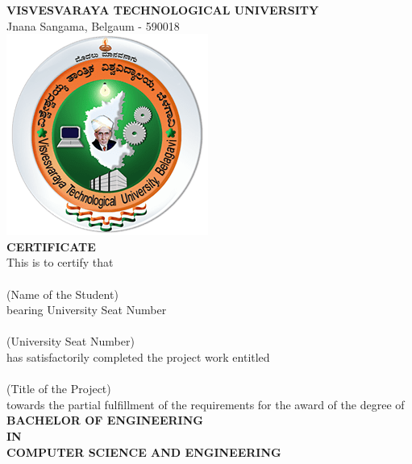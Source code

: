\documentclass[11pt, a4paper]{report}
\begin{document}
\begin{titlepage}
    \begin{center}
        \textbf{\Large VISVESVARAYA TECHNOLOGICAL UNIVERSITY}\\
        {\normalsize Jnana Sangama, Belgaum - 590018}\\[0.6cm]
        
        \includegraphics[scale=0.4]{resources/vtu.png}\\[0.5cm]
        
        {\Large \textbf{CERTIFICATE}}\\[1cm]
        {\normalsize This is to certify that} \\[0.3cm]

        \underline{\hspace{9cm}} \\[0.3cm]
        {\normalsize (Name of the Student)} \\[0.5cm]
        {\normalsize bearing University Seat Number} \\[0.3cm]
         
        \underline{\hspace{8cm}} \\[0.3cm]
        {\normalsize (University Seat Number)} \\[0.5cm]
        {\normalsize has satisfactorily completed the project work entitled} \\[0.3cm]
        
        \underline{\hspace{10cm}} \\[0.3cm]
        {\normalsize (Title of the Project)} \\[0.5cm]
        {\normalsize towards the partial fulfillment of the requirements for the award of the degree of} \\[0.3cm]
        
        {\large \textbf{BACHELOR OF ENGINEERING}}\\[0.3cm]
        {\large \textbf{IN}}\\[0.3cm]
        {\large \textbf{COMPUTER SCIENCE AND ENGINEERING}}\\[1cm]
        

\end{center}
\end{titlepage}
\end{document}
